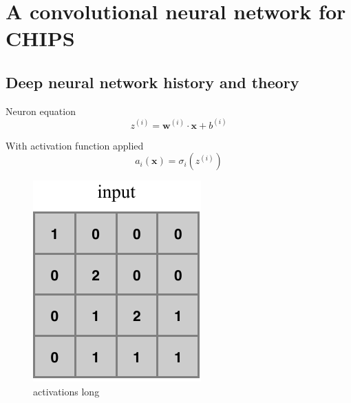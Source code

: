 \chapter{A convolutional neural network for CHIPS}
\label{chap:cvn}

\section{Deep neural network history and theory}

Neuron equation
\begin{equation}
    z^{(i)}=\boldsymbol{w}^{(i)}\cdot\boldsymbol{x}+b^{(i)}
\end{equation}

With activation function applied
\begin{equation}
    a_{i}(\boldsymbol{x})=\sigma_i(z^{(i)})
\end{equation}

\begin{figure}
    \includegraphics[width=\textwidth]{diagrams/6-cvn/conv_input.pdf}
    \caption[activations short]%
    {activations long}
    \label{fig:activations}
\end{figure}

